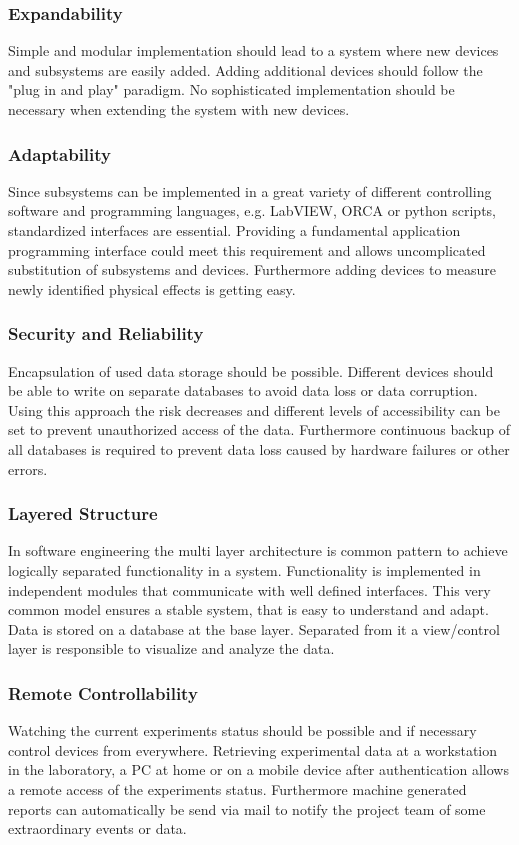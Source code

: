 \subsubsection*{Expandability}
Simple and modular implementation should lead to a system where new devices and subsystems are easily added. Adding additional devices should follow the "plug in and play" paradigm. No sophisticated implementation should be necessary when extending the system with new devices.

\subsubsection*{Adaptability}
Since subsystems can be implemented in a great variety of different controlling software and programming languages, e.g. LabVIEW, ORCA or python scripts, standardized interfaces are essential. Providing a fundamental application programming interface could meet this requirement and allows uncomplicated substitution of subsystems and devices. Furthermore adding devices to measure newly identified physical effects is getting easy.

\subsubsection*{Security and Reliability}
Encapsulation of used data storage should be possible. Different devices should be able to write on separate databases to avoid data loss or data corruption. Using this approach the risk decreases and different levels of accessibility can be set to prevent unauthorized access of the data. Furthermore continuous backup of all databases is required to prevent data loss caused by hardware failures or other errors. 

\subsubsection*{Layered Structure}
In software engineering the multi layer architecture is  common pattern to achieve logically separated functionality in a system. Functionality is implemented in independent modules that communicate with well defined interfaces. This very common model ensures a stable system, that is easy to understand and adapt. Data is stored on a database at the base layer. Separated from it a view/control layer is responsible to visualize and analyze the data.

\subsubsection*{Remote Controllability}
Watching the current experiments status should be possible and if necessary control devices from everywhere. Retrieving experimental data at a workstation in the laboratory, a PC at home or on a mobile device after authentication allows a remote access of the experiments status. Furthermore machine generated reports can automatically be send via mail to notify the project team of some extraordinary events or data.

